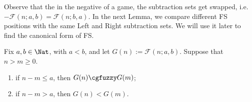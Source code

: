 \documentclass[oneside,reqno]{amsart}
\newcommand{\fs}{\mathcal{F}}
\begin{document}

Observe that the in the negative of a game, the subtraction sets get swapped, i.e. $-\fs(n;a,b)=\fs(n;b,a)$. In the next Lemma, we compare different {\sc FS} positions with the same Left and Right subtraction sets. We will use it later to find the canonical form of {\sc FS}.
\begin{lemma}\label{lem: game position comparison FS}
    Fix $a,b\in \Nat$, with $a<b$, and let $G(n):=\fs(n;a,b)$. Suppose that $n> m\ge 0$. 
    \begin{enumerate}
        \item\label{item: lem: game position comparison FS:1} if $n-m\le a$, then $G(n)\cgfuzzy G(m)$;
        \item if $n-m > a$, then  $G(n)<G(m)$.%
    \end{enumerate}
\end{lemma}
\end{document}
